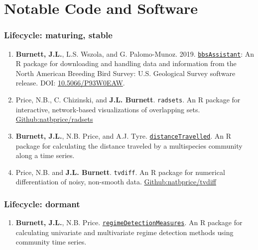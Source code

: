 \documentclass[11pt,]{article}
\providecommand{\tightlist}{%
  \setlength{\itemsep}{0pt}\setlength{\parskip}{0pt}}
\begin{document}
\hypertarget{notable-code-and-software}{%
\section{Notable Code and Software}\label{notable-code-and-software}}

\hypertarget{lifecycle-maturing-stable}{%
\subsubsection{Lifecycle: maturing,
stable}\label{lifecycle-maturing-stable}}

\begin{enumerate}
\def\labelenumi{\arabic{enumi}.}
\tightlist
\item
  \textbf{Burnett, J.L.}, L.S. Wszola, and G. Palomo-Munoz. 2019.
  \href{https://github.com/TrashBirdEcology/bbsAssistant}{\texttt{bbsAssistant}}:
  An R package for downloading and handling data and information from
  the North American Breeding Bird Survey: U.S. Geological Survey
  software release. DOI:
  \href{https://doi.org/10.5066/P93W0EAW}{10.5066/P93W0EAW}.
\item
  Price, N.B., C. Chizinski, and \textbf{J.L. Burnett}.
  \texttt{radsets}. An R package for interactive, network-based
  visualizations of overlapping sets.
  \href{https://natbprice.github.io/radsets/}{Github:natbprice/radsets}
\item
  \textbf{Burnett, J.L.}, N.B. Price, and A.J. Tyre.
  \href{https://github.com/TrashBirdEcology/distancetravelled}{\texttt{distanceTravelled}}.
  An R package for calculating the distance traveled by a multispecies
  community along a time series.
\item
  Price, N.B. and \textbf{J.L. Burnett}. \texttt{tvdiff}. An R package
  for numerical differentiation of noisy, non-smooth data.
  \href{https://github.com/natbprice/tvdiff}{Github:natbprice/tvdiff}
\end{enumerate}

\hypertarget{lifecycle-dormant}{%
\subsubsection{Lifecycle: dormant}\label{lifecycle-dormant}}

\begin{enumerate}
\def\labelenumi{\arabic{enumi}.}
\tightlist
\item
  \textbf{Burnett, J.L.}, N.B. Price.
  \href{https://github.com/TrashBirdEcology/regimedetectionmeasures}{\texttt{regimeDetectionMeasures}}.
  An R package for calculating univariate and multivariate regime
  detection methods using community time series.
\end{enumerate}
\end{document}
